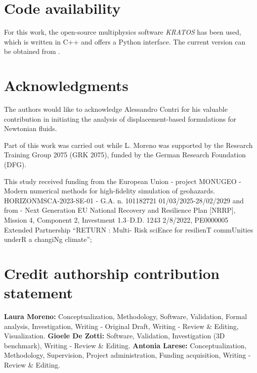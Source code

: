 \documentclass[11pt,english]{article}
\begin{document}
\section*{Code availability}
For this work, the open-source multiphysics software \textit{KRATOS} \cite{kratos1,kratos2,kratos3} has been used, which is written in C++ and offers a Python interface. The current version can be obtained from \cite{KratosGithub}.


\section*{Acknowledgments}
The authors would like to acknowledge Alessandro Contri for his valuable contribution in initiating the analysis of displacement-based formulations for Newtonian fluids.

Part of this work was carried out while L. Moreno was supported by the Research Training Group 2075 (GRK 2075), funded by the German Research Foundation (DFG).

This study received funding from the European Union - project MONUGEO - Modern numerical methods for high-fidelity simulation of geohazards. HORIZONMSCA-2023-SE-01 - G.A. n. 101182721 01/03/2025-28/02/2029 and from - Next Generation EU National Recovery and Resilience Plan [NRRP], Mission 4, Component 2, Investment 1.3–D.D. 1243 2/8/2022, PE0000005 Extended Partnership “RETURN : Multi- Risk sciEnce for resilienT commUnities underR a changiNg climate”;

\section*{Credit authorship contribution statement}


\textbf{Laura Moreno:} Conceptualization, Methodology, Software, Validation, Formal analysis, Investigation, Writing - Original Draft, Writing - Review \& Editing, Visualization. 
\textbf{Gioele De Zotti:} Software, Validation, Investigation (3D benchmark), Writing - Review \& Editing.
\textbf{Antonia Larese:} Conceptualization,  Methodology, Supervision, Project administration, Funding acquisition, Writing - Review \& Editing. 


 



    
\end{document}
